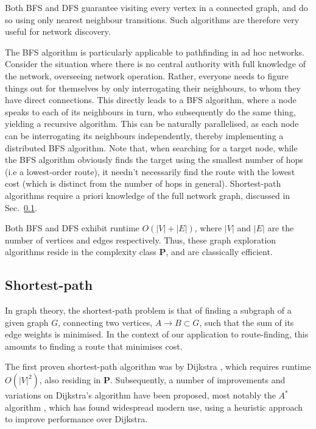 \documentclass[aps, rmp, twocolumn, amsmath, amssymb, nofootinbib, superscriptaddress, longbibliography, floatfix, table-of-contents, eqsecnum]{revtex4-1}
\begin{document}
Both BFS and DFS guarantee visiting every vertex in a connected graph, and do so using only nearest neighbour transitions. Such algorithms are therefore very useful for network discovery.

The BFS algorithm is particularly applicable to pathfinding in ad hoc networks. Consider the situation where there is no central authority with full knowledge of the network, overseeing network operation. Rather, everyone needs to figure things out for themselves by only interrogating their neighbours, to whom they have direct connections. This directly leads to a BFS algorithm, where a node speaks to each of its neighbours in turn, who subsequently do the same thing, yielding a recursive algorithm. This can be naturally parallelised, as each node can be interrogating its neighbours independently, thereby implementing a distributed BFS algorithm. Note that, when searching for a target node, while the BFS algorithm obviously finds the target using the smallest number of hops (i.e a lowest-order route), it needn't necessarily find the route with the lowest cost (which is distinct from the number of hops in general). Shortest-path algorithms require a priori knowledge of the full network graph, discussed in Sec.~\ref{sec:shortest_path}.

Both BFS and DFS exhibit runtime \mbox{$O(|V|+|E|)$}, where $|V|$ and $|E|$ are the number of vertices and edges respectively. Thus, these graph exploration algorithms reside in the complexity class \textbf{P}, and are classically efficient.

%
%

\subsection{Shortest-path} \label{sec:shortest_path} 

In graph theory, the shortest-path problem is that of finding a subgraph of a given graph $G$, connecting two vertices, \mbox{$A\to B \subset G$}, such that the sum of its edge weights is minimised. In the context of our application to route-finding, this amounts to finding a route that minimises cost.

The first proven shortest-path algorithm was by Dijkstra \cite{bib:Dijkstra59}, which requires runtime $O(|V|^2)$, also residing in \textbf{P}. Subsequently, a number of improvements and variations on Dijkstra's algorithm have been proposed, most notably the $A^*$ algorithm \cite{bib:Astar}, which has found widespread modern use, using a heuristic approach to improve performance over Dijkstra.
\end{document}

